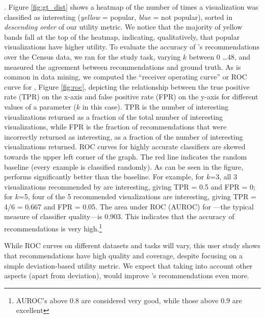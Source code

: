 .
Figure \ref{fig:gt_dist} shows a heatmap of the number of times a
visualization was classified as interesting 
({\em yellow} = popular, {\em blue} = not popular), sorted
in {\em descending order} of our utility metric.
We notice that the majority of yellow bands fall at the top of the
heatmap, indicating, qualitatively, that popular visualizations have higher utility.
To evaluate the accuracy of \SeeDB's recommendations over the Census data, 
we ran \SeeDB for the study task, varying $k$ between 0 \ldots 48, and measured
the agreement between \SeeDB recommendations and ground truth.
As is common in data mining, 
we computed the ``receiver operating curve'' or ROC curve for \SeeDB, 
Figure \ref{fig:roc}, depicting 
the relationship between the true positive rate (TPR) on the 
x-axis and false positive rate (FPR) on the y-axis for different values of a
parameter ($k$ in this case). 
TPR is the number of interesting visualizations returned as a fraction of the 
total number of interesting visualizations, 
while FPR is the fraction of recommendations
that were incorrectly returned as interesting, as a fraction of the number
of interesting visualizations returned. 
ROC curves for highly accurate classifiers are skewed towards the upper left
corner of the graph. The red line indicates the random baseline (every example
is classified randomly).
As can be seen in the figure, \SeeDB performs significantly better than the baseline.
For example, for $k$=3, all 3 visualizations recommended by \SeeDB are interesting,
giving TPR = 0.5 and FPR = 0; for $k$=5, 
four of the 5 recommended visualizations are interesting, 
giving TPR = 4/6 = 0.667 and FPR = 0.05. 
The area under ROC (AUROC) for \SeeDB---the typical measure of 
classifier quality---is 0.903.
This indicates that the accuracy of \SeeDB recommendations is very high.\footnote{\small AUROC's 
above 0.8 are considered very good, while those above 0.9 are
excellent}

While ROC curves on different datasets and tasks will vary,
this user study shows that \SeeDB recommendations have high quality
and coverage,
despite focusing on a simple deviation-based utility metric.
We expect that taking into account other aspects (apart from deviation),
would improve \SeeDB's recommendations even more.

